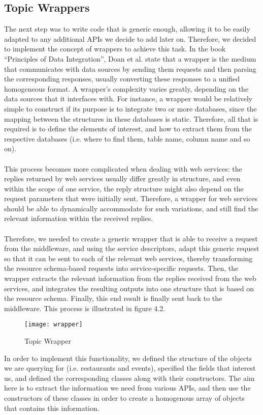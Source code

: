 \subsection{Topic Wrappers}
The next step was to write code that is generic enough, allowing it to be easily adapted to any additional APIs we decide to add later on. Therefore, we decided to implement the concept of wrappers to achieve this task. In the book ``Principles of Data Integration'', Doan et al.\cite{doan} state that a wrapper is the medium that communicates with data sources by sending them requests and then parsing the corresponding responses, usually converting these responses to a unified homogeneous format. A wrapper's complexity varies greatly, depending on the data sources that it interfaces with. For instance, a wrapper would be relatively simple to construct if its purpose is to integrate two or more databases, since the mapping between the structures in these databases is static. Therefore, all that is required is to define the elements of interest, and how to extract them from the respective databases (i.e. where to find them, table name, column name and so on).\\\\
This process becomes more complicated when dealing with web services: the replies returned by web services usually differ greatly in structure, and even within the scope of one service, the reply structure might also depend on the request parameters that were initially sent. Therefore, a wrapper for web services should be able to dynamically accommodate for such variations, and still find the relevant information within the received replies.\\\\
Therefore, we needed to create a generic wrapper that is able to receive a request from the middleware, and using the service descriptors, adapt this generic request so that it can be sent to each of the relevant web services, thereby transforming the resource schema-based requests into service-specific requests. Then, the wrapper extracts the relevant information from the replies received from the web services, and integrates the resulting outputs into one structure that is based on the resource schema. Finally, this end result is finally sent back to the middleware. This process is illustrated in figure 4.2.
\begin{figure}[h]
\centering
\texttt{[image: wrapper]}
\caption{Topic Wrapper}
\end{figure}
\newpage
\noindent In order to implement this functionality, we defined the structure of the objects we are querying for (i.e. restaurants and events), specified the fields that interest us, and defined the corresponding classes along with their constructors. The aim here is to extract the information we need from various APIs, and then use the constructors of these classes in order to create a homogenous array of objects that contains this information.
